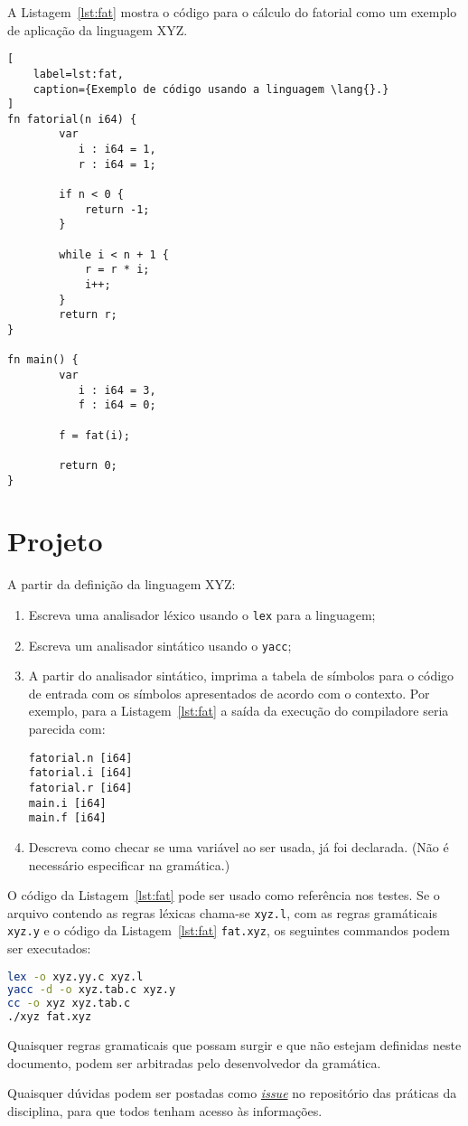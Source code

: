 \documentclass{article}
\def\lang{{\sc XYZ}}
\begin{document}
\pagebreak
A Listagem~\ref{lst:fat} mostra o código para o cálculo 
do fatorial como um exemplo de aplicação da linguagem 
\lang.

\begin{lstlisting}[
    label=lst:fat,
    caption={Exemplo de código usando a linguagem \lang{}.}
]
fn fatorial(n i64) {
        var
           i : i64 = 1,
           r : i64 = 1;
    
        if n < 0 {
            return -1;
        }

        while i < n + 1 {
            r = r * i;
            i++;
        }
        return r;
}
    
fn main() {
        var 
           i : i64 = 3,
           f : i64 = 0;
    
        f = fat(i);

        return 0;
}
\end{lstlisting}

\section*{Projeto}

A partir da definição da linguagem \lang:

\begin{enumerate}
\item Escreva uma analisador léxico usando o {\tt lex} 
para a linguagem;
\item Escreva um analisador sintático usando o {\tt yacc};
\item A partir do analisador sintático, imprima a tabela de 
símbolos para o código de entrada com os símbolos apresentados 
de acordo com o contexto. Por exemplo, para a Listagem~\ref{lst:fat}
a saída da execução do compiladore seria parecida com:

\begin{verbatim}
fatorial.n [i64]
fatorial.i [i64]
fatorial.r [i64]
main.i [i64]
main.f [i64]
\end{verbatim}

\item Descreva como checar se uma variável ao ser usada, já foi
  declarada. (Não é necessário especificar na gramática.)
\end{enumerate}

O código da Listagem~\ref{lst:fat} pode ser usado como referência
nos testes. Se o arquivo contendo as regras léxicas chama-se 
{\tt xyz.l}, com as regras gramáticais {\tt xyz.y} e o 
código da Listagem~\ref{lst:fat} {\tt fat.xyz}, os seguintes 
commandos podem ser executados:

\begin{lstlisting}[language=bash]
lex -o xyz.yy.c xyz.l
yacc -d -o xyz.tab.c xyz.y
cc -o xyz xyz.tab.c
./xyz fat.xyz
\end{lstlisting}

Quaisquer regras gramaticais que possam surgir 
e que não estejam definidas neste documento,
podem ser arbitradas pelo desenvolvedor da
gramática.

Quaisquer dúvidas podem ser postadas como 
\href{https://github.com/ajholanda/edu-compiladores/issues}{{\it issue}}
no repositório das práticas da disciplina, para que todos
tenham acesso às informações.
\end{document}

